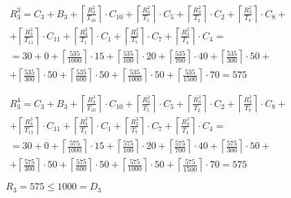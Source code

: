 \begin{gather*}
  \begin{multlined}
    R_3^3 = C_3 + B_3 + \left\lceil\frac{R_3^2}{T_{10}}\right\rceil\cdot C_{10} + %
    \left\lceil\frac{R_3^2}{T_5}\right\rceil\cdot C_5 + %
    \left\lceil\frac{R_3^2}{T_2}\right\rceil\cdot C_2 + %
    \left\lceil\frac{R_3^2}{T_8}\right\rceil\cdot C_8 + \\%
    + \left\lceil\frac{R_3^2}{T_{11}}\right\rceil\cdot C_{11} + %
    \left\lceil\frac{R_3^2}{T_1}\right\rceil\cdot C_1 +%
    \left\lceil\frac{R_3^2}{T_7}\right\rceil\cdot C_7 +%
    \left\lceil\frac{R_3^2}{T_4}\right\rceil\cdot C_4 = \\%
    = 30 + 0 + \left\lceil\frac{535}{1000}\right\rceil\cdot 15 + %
    \left\lceil\frac{535}{100}\right\rceil\cdot 20 + %
    \left\lceil\frac{535}{700}\right\rceil\cdot 40 + %
    \left\lceil\frac{535}{300}\right\rceil\cdot 50 + \\%
    + \left\lceil\frac{535}{300}\right\rceil\cdot 50 + %
    \left\lceil\frac{535}{600}\right\rceil\cdot 50 + %
    \left\lceil\frac{535}{1000}\right\rceil\cdot 50 +%
    \left\lceil\frac{535}{1500}\right\rceil\cdot 70 = 575 \\
  \end{multlined} \\
  \begin{multlined}
    R_3^4 = C_3 + B_3 + \left\lceil\frac{R_3^3}{T_{10}}\right\rceil\cdot C_{10} + %
    \left\lceil\frac{R_3^3}{T_5}\right\rceil\cdot C_5 + %
    \left\lceil\frac{R_3^3}{T_2}\right\rceil\cdot C_2 + %
    \left\lceil\frac{R_3^3}{T_8}\right\rceil\cdot C_8 + \\%
    + \left\lceil\frac{R_3^3}{T_{11}}\right\rceil\cdot C_{11} + %
    \left\lceil\frac{R_3^3}{T_1}\right\rceil\cdot C_1 +%
    \left\lceil\frac{R_3^3}{T_7}\right\rceil\cdot C_7 +%
    \left\lceil\frac{R_3^3}{T_4}\right\rceil\cdot C_4 = \\%
    = 30 + 0 + \left\lceil\frac{575}{1000}\right\rceil\cdot 15 + %
    \left\lceil\frac{575}{100}\right\rceil\cdot 20 + %
    \left\lceil\frac{575}{700}\right\rceil\cdot 40 + %
    \left\lceil\frac{575}{300}\right\rceil\cdot 50 + \\%
    + \left\lceil\frac{575}{300}\right\rceil\cdot 50 + %
    \left\lceil\frac{575}{600}\right\rceil\cdot 50 + %
    \left\lceil\frac{575}{1000}\right\rceil\cdot 50 +%
    \left\lceil\frac{575}{1500}\right\rceil\cdot 70 = 575 \\
  \end{multlined} \\
  R_3 = 575 \le 1000 = D_3
\end{gather*}

